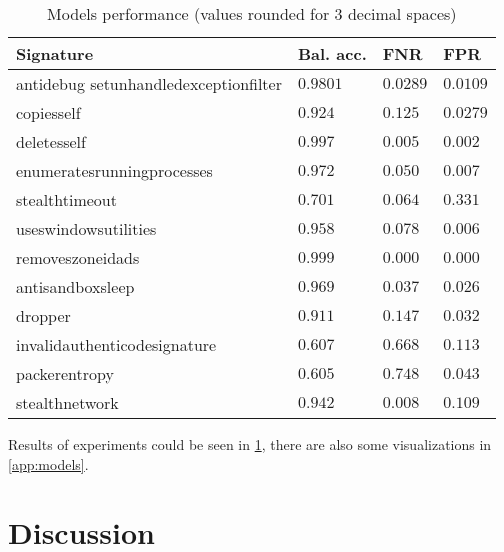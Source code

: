 \begin{table}[h]
  \centering
  \caption{Models performance (values rounded for 3 decimal spaces)}
  \begin{tabular}{llll}
      \toprule
      \textbf{Signature} &
      \textbf{Bal. acc.} &
      \textbf{FNR} &
      \textbf{FPR}
      \\
      \midrule
      antidebug setunhandledexceptionfilter & $0.9801$ & $0.0289$ & $0.0109$ \\
      \midrule
      copiesself & $0.924$ & $0.125$ & $0.0279$ \\
      \midrule
      deletesself & $0.997$ & $0.005$ & $0.002$ \\
      \midrule
      enumeratesrunningprocesses & $0.972$ & $0.050$ & $0.007$ \\
      \midrule
      stealthtimeout & $0.701$ & $0.064$ & $0.331$ \\
      \midrule
      useswindowsutilities & $0.958$ & $0.078$ & $0.006$ \\
      \midrule
      removeszoneidads & $0.999$ & $0.000$ & $0.000$ \\
      \midrule
      antisandboxsleep & $0.969$ & $0.037$ & $0.026$ \\
      \midrule
      dropper & $0.911$ & $0.147$ & $0.032$ \\
      \midrule
      invalidauthenticodesignature & $0.607$ & $0.668$ & $0.113$ \\
      \midrule
      packerentropy & $0.605$ & $0.748$ & $0.043$ \\
      \midrule
      stealthnetwork & $0.942$ & $0.008$ & $0.109$ \\
      \bottomrule
  \end{tabular}
  \label{tab:models_res}
\end{table}

Results of experiments could be seen in \ref{tab:models_res}, there are also some visualizations in \ref{app:models}.

\section{Discussion}


